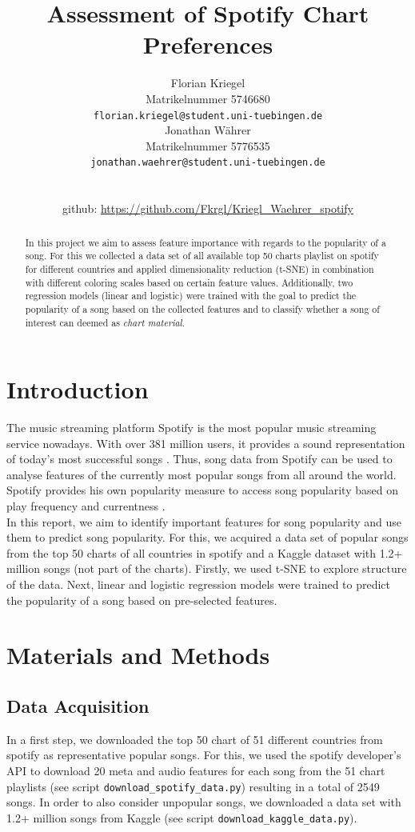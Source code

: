 \documentclass{article}
\title{Assessment of Spotify Chart Preferences}
\author{%
  Florian Kriegel\\
  Matrikelnummer 5746680\\
  \texttt{florian.kriegel@student.uni-tuebingen.de} \\
  \And
  Jonathan Währer\\
  Matrikelnummer 5776535\\
  \texttt{jonathan.waehrer@student.uni-tuebingen.de} \\\\\\
  github: \url{https://github.com/Fkrgl/Kriegl_Waehrer_spotify}
}
\begin{document}
\maketitle

\begin{abstract}
  In this project we aim to assess feature importance with regards to the popularity of a song. For this we collected a data set of all available top 50 charts playlist on spotify for different countries and applied dimensionality reduction (t-SNE) in combination with different coloring scales based on certain feature values. 
  Additionally, two regression models (linear and logistic) were trained with the goal to predict the popularity of a song based on the collected features and to classify whether a song of interest can deemed as \textit{chart material}.
\end{abstract}

\section{Introduction}
The music streaming platform Spotify is the most popular music streaming service nowadays. With over 381 million users, it provides a sound representation of today's most successful songs \cite{Spotify_users}. 
Thus, song data from Spotify can be used to analyse features of the currently most popular songs from all around the world. Spotify provides his own popularity measure to access song popularity based on play frequency and currentness \cite{Spotify_pop}.\\
In this report, we aim to identify important features for song popularity and use them to predict song popularity. For this, we acquired a data set of popular songs from the top 50 charts of all countries in spotify and a Kaggle dataset with 1.2+ million songs (not part of the charts).
Firstly, we used t-SNE to explore structure of the data. Next, linear and logistic regression models were trained to predict the popularity of a song based on pre-selected features.

\section{Materials and Methods}
\subsection{Data Acquisition}
In a first step, we downloaded the top 50 chart of 51 different countries from spotify as representative popular songs. 
For this, we used the spotify developer's API \cite{Spotify_developers} to download 20 meta and audio features for each song from the 51 chart playlists (see script \texttt{download\_spotify\_data.py}) resulting in a total of 2549 songs. 
In order to also consider unpopular songs, we downloaded a data set with 1.2+ million songs from Kaggle \cite{Spotify_Kaggle} (see script \texttt{download\_kaggle\_data.py}).
\end{document}
